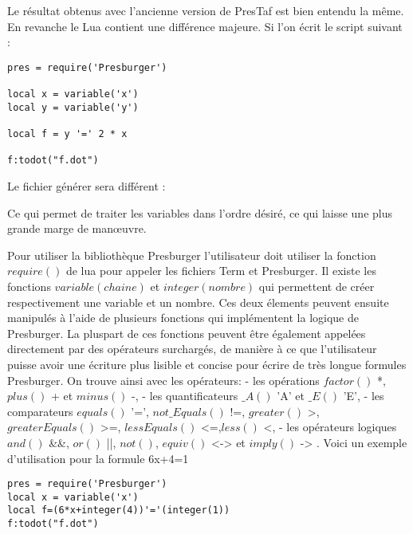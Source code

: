 Le résultat obtenus avec l'ancienne version de PresTaf est bien entendu la même. En revanche le Lua contient une différence majeure. Si l'on écrit le script suivant :

\begin{lstlisting}[mathescape=true, frame=single]
pres = require('Presburger')

local x = variable('x')
local y = variable('y')

local f = y '=' 2 * x 

f:todot("f.dot")
\end{lstlisting}

Le fichier générer sera différent : \vspace{0.5cm}


Ce qui permet de traiter les variables dans l'ordre désiré, ce qui laisse une plus grande marge de man\oe{}uvre.

Pour utiliser la bibliothèque Presburger l'utilisateur doit utiliser la fonction $require()$ de lua pour appeler les fichiers Term et Presburger.
Il existe les fonctions $variable(chaine)$ et $integer(nombre)$ qui permettent de créer respectivement une variable et un nombre. Ces deux élements peuvent ensuite manipulés à l'aide de plusieurs fonctions qui implémentent la logique de Presburger.
La pluspart de ces fonctions peuvent être également appelées directement par des opérateurs surchargés, de manière à ce que l'utilisateur puisse avoir une écriture plus lisible et concise pour écrire de très longue formules Presburger.
On trouve ainsi avec les opérateurs:
 - les opérations $factor()$ *, $plus()$ + et $minus()$ -,
 - les quantificateurs $\_A()$ 'A' et $\_E()$ 'E',
 - les comparateurs $equals()$ '=', $not\_Equals()$ !=, $greater()$ >, $greaterEquals()$ >=, $lessEquals()$ <=,$less()$ <,
 - les opérateurs logiques $and()$ \&\&, $or()$ ||, $not()$, $equiv()$ <->  et $imply()$ -> .
Voici un exemple d'utilisation pour la formule 6x+4=1\\
 
\begin{lstlisting}[mathescape=true, frame=single]
pres = require('Presburger')
local x = variable('x')
local f=(6*x+integer(4))'='(integer(1))
f:todot("f.dot")
\end{lstlisting}



